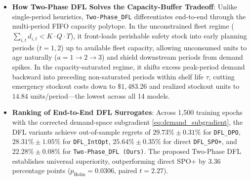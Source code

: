 \documentclass[11pt,a4paper]{article}
\theoremstyle{definition}
\theoremstyle{remark}
\begin{document}
\begin{itemize}[leftmargin=*]
\begin{proof}
\begin{enumerate}[label=\textbf{Part \arabic*.},wide=0pt]
        By contrast, as visualized in Figure~\ref{fig:inventory_trajectory}, \texttt{Two-Phase\_DFL (Ours)} differentiates end-to-end through the multi-period FIFO polytope, learning the capacity shadow prices $\lambda_t^*$ and dynamically shifting peak demands across the planning horizon. In Period 1 and 2, it delivers up to fleet capacity ($100\%$ and $86.7\%$ binding frequency) to build durable inventory buffers ($25.30$ and $40.26$ units carryover). When customer demands spike in Period 3, Two-Phase DFL smoothly taps into carryover inventory, dropping capacity binding frequency down to $46.67\%$ (compared to $80.0\%$ for Quantile PTO and $96.7\%$ for Safety-Stock PTO) and averaging $69.33\%$ overall. Furthermore, it preserves equitable delivery frequencies across the spatial network ($93.3\%$ for Store 4, $91.3\%$ for Store 6, and $96.0\%$ for Store 10), slashing peripheral rationing ($PRI \le 2.45$, mean stockout $2.41$ units per store) and cutting total stockout cost to $\$1,483.26$ and normalized regret to $22.28\% \pm 0.08\%$. This completes Part~(iii) and the proof.
    \end{enumerate}
    \end{proof}

    \item \textbf{How Two-Phase DFL Solves the Capacity-Buffer Tradeoff}: Unlike single-period heuristics, \texttt{Two-Phase\_DFL} differentiates end-to-end through the multi-period FIFO capacity polytope. In the unconstrained fleet regime ($\sum_{i,t} \hat{d}_{i,t} < K \cdot Q \cdot T$), it front-loads perishable safety stock into early planning periods ($t = 1, 2$) up to available fleet capacity, allowing unconsumed units to age naturally ($a = 1 \to 2 \to 3$) and shield downstream periods from demand spikes. In the capacity-saturated regime, it shifts excess peak-period demand backward into preceding non-saturated periods within shelf life $\tau$, cutting emergency stockout costs down to $\$1,483.26$ and realized stockout units to $14.84$ units/period—the lowest across all 14 models.
    \item \textbf{Ranking of End-to-End DFL Surrogates}: Across 1,500 training epochs with the corrected demand-space subgradient \eqref{eq:demand_subgradient}, the DFL variants achieve out-of-sample regrets of $29.73\% \pm 0.31\%$ for \texttt{DFL\_DPO}, $28.31\% \pm 1.05\%$ for \texttt{DFL\_IntOpt}, $25.64\% \pm 0.35\%$ for direct \texttt{DFL\_SPO+}, and $22.28\% \pm 0.08\%$ for \texttt{Two-Phase\_DFL (Ours)}. The proposed Two-Phase DFL establishes universal superiority, outperforming direct SPO+ by $3.36$ percentage points ($p_{\text{Holm}} = 0.0306$, paired $t = 2.27$).
\end{itemize}
\end{document}
